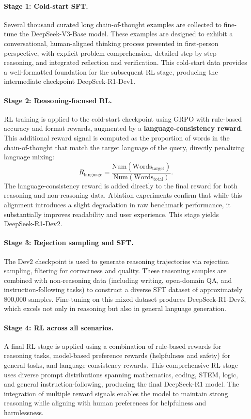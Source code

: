 \paragraph{Stage 1: Cold-start SFT.} Several thousand curated long
chain-of-thought examples are collected to fine-tune the DeepSeek-V3-Base model. These
examples are designed to exhibit a conversational, human-aligned thinking process
presented in first-person perspective, with explicit problem comprehension, detailed
step-by-step reasoning, and integrated reflection and verification. This cold-start
data provides a well-formatted foundation for the subsequent RL stage, producing the
intermediate checkpoint DeepSeek-R1-Dev1.

\paragraph{Stage 2: Reasoning-focused RL.} RL training is applied to the cold-start
checkpoint using GRPO with rule-based accuracy and format rewards, augmented by a
\textbf{language-consistency reward}. This additional reward signal is computed as the
proportion of words in the chain-of-thought that match the target language of the
query, directly penalizing language mixing:
\begin{equation}
    R_{\text{language}} = \frac{\text{Num}(\text{Words}_{\text{target}})}{\text{Num}(\text{Words}_{\text{total}})}.
\end{equation}
The language-consistency reward is added directly to the final reward for both
reasoning and non-reasoning data. Ablation experiments confirm that while this
alignment introduces a slight degradation in raw benchmark performance, it
substantially improves readability and user experience. This stage yields
DeepSeek-R1-Dev2.

\paragraph{Stage 3: Rejection sampling and SFT.} The Dev2 checkpoint is used to
generate reasoning trajectories via rejection sampling, filtering for correctness and
quality. These reasoning samples are combined with non-reasoning data (including
writing, open-domain QA, and instruction-following tasks) to construct a diverse SFT
dataset of approximately 800{,}000 samples. Fine-tuning on this mixed dataset produces
DeepSeek-R1-Dev3, which excels not only in reasoning but also in general language
generation.

\paragraph{Stage 4: RL across all scenarios.} A final RL stage is applied using a
combination of rule-based rewards for reasoning tasks, model-based preference rewards
(helpfulness and safety) for general tasks, and language-consistency rewards. This
comprehensive RL stage uses diverse prompt distributions spanning mathematics, coding,
STEM, logic, and general instruction-following, producing the final DeepSeek-R1 model.
The integration of multiple reward signals enables the model to maintain strong
reasoning while aligning with human preferences for helpfulness and harmlessness.

